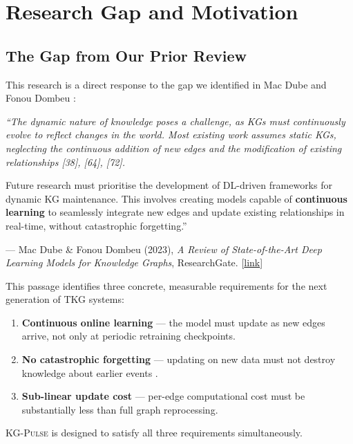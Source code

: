 \documentclass[10pt,a4paper,twocolumn]{article}
\theoremstyle{definition}
\newcommand{\ourmodel}{\textsc{KG-Pulse}}
\begin{document}
\section{Research Gap and Motivation}
\label{sec:gap}

\subsection{The Gap from Our Prior Review}

This research is a direct response to the gap we identified in
Mac Dube and Fonou Dombeu \cite{MacDube2023review}:

\begin{tcolorbox}[gapstyle]
\itshape
``The dynamic nature of knowledge poses a challenge, as KGs must
continuously evolve to reflect changes in the world.
Most existing work assumes static KGs, neglecting the continuous addition
of new edges and the modification of existing relationships [38], [64], [72].

Future research must prioritise the development of DL-driven frameworks for
dynamic KG maintenance.
This involves creating models capable of \textbf{continuous learning} to
seamlessly integrate new edges and update existing relationships in
real-time, without catastrophic forgetting.''

\medskip
\normalfont\scriptsize
--- Mac Dube \& Fonou Dombeu (2023),
\textit{A Review of State-of-the-Art Deep Learning Models for Knowledge Graphs},
ResearchGate.
[\href{https://www.researchgate.net/publication/400549862}{link}]
\end{tcolorbox}

This passage identifies three concrete, measurable requirements for the next
generation of TKG systems:
\begin{enumerate}[leftmargin=1.5em,itemsep=3pt,topsep=3pt]
  \item \textbf{Continuous online learning} — the model must update as
        new edges arrive, not only at periodic retraining checkpoints.
  \item \textbf{No catastrophic forgetting} — updating on new data must
        not destroy knowledge about earlier events
        \cite{McCloskey1989catastrophic}.
  \item \textbf{Sub-linear update cost} — per-edge computational cost
        must be substantially less than full graph reprocessing.
\end{enumerate}
\ourmodel{} is designed to satisfy all three requirements simultaneously.
\end{document}
